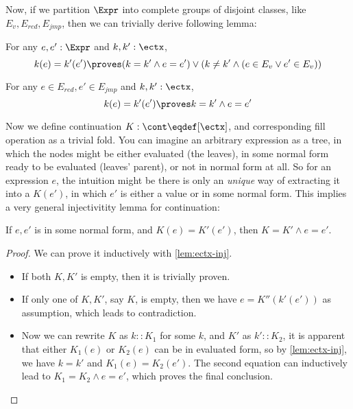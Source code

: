 Now, if we partition $\Expr$ into complete groups of disjoint classes, like $E_v, E_{red}, E_{jmp}$,
then we can trivially derive following lemma:

\begin{lemma}\label{lem:ectx-inj}
For any $e, e': \Expr$ and $k, k': \ectx$,
\[
k(e) = k'(e') \proves (k = k' \land e = e') \lor (k \neq k' \land (e \in E_v \lor e' \in E_v))
\]
\end{lemma}

\begin{lemma}
For any $e \in E_{red}, e' \in E_{jmp}$ and $k, k': \ectx$,
\[
k(e) = k'(e') \proves k = k' \land e = e'
\]
\end{lemma}

Now we define continuation $K : \cont \eqdef [\ectx]$, and corresponding fill operation as a trivial fold.
You can imagine an arbitrary expression as a tree, in which the nodes might be either evaluated (the leaves),
in some normal form ready to be evaluated (leaves' parent), or not in normal form at all.
So for an expression $e$, the intuition might be there is only an \emph{unique} way of
extracting it into a $K(e')$, in which $e'$ is either a value or in some normal form. This implies a very general
injectivitity lemma for continuation:

\begin{lemma}
If $e, e'$ is in some normal form, and $K(e) = K'(e')$, then $K = K' \land e = e'$.
\end{lemma}
\begin{proof}
We can prove it inductively with \ref{lem:ectx-inj}.

\begin{itemize}
\item If both $K, K'$ is empty, then it is trivially proven.
\item If only one of $K, K'$, say $K$, is empty, then we have $e = K''(k'(e'))$ as assumption, which leads to
contradiction.
\item Now we can rewrite $K$ as $k::K_1$ for some $k$, and $K'$ as $k'::K_2$, it is apparent that either
$K_1(e)$ or $K_2(e)$ can be in evaluated form, so by \ref{lem:ectx-inj}, we have $k = k'$ and $K_1(e) = K_2(e')$.
The second equation can inductively lead to $K_1 = K_2 \land e = e'$, which proves the final conclusion.
\end{itemize}
\end{proof}
